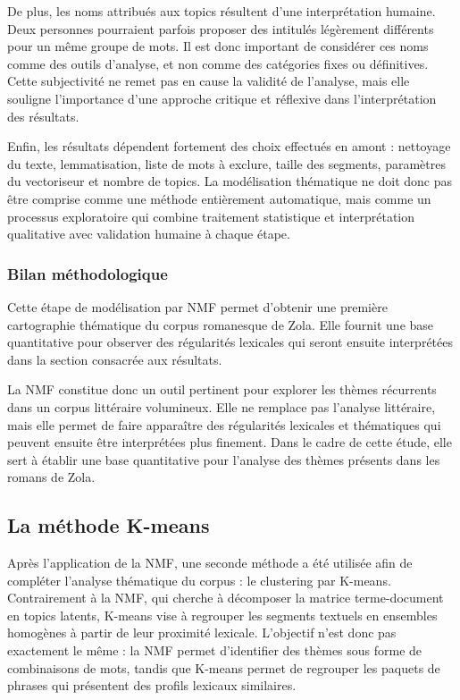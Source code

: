 De plus, les noms attribués aux topics résultent d’une interprétation humaine. Deux personnes pourraient parfois proposer des intitulés légèrement différents pour un même groupe de mots. Il est donc important de considérer ces noms comme des outils d’analyse, et non comme des catégories fixes ou définitives. Cette subjectivité ne remet pas en cause la validité de l’analyse, mais elle souligne l’importance d’une approche critique et réflexive dans l’interprétation des résultats.

Enfin, les résultats dépendent fortement des choix effectués en amont : nettoyage du texte, lemmatisation, liste de mots à exclure, taille des segments, paramètres du vectoriseur et nombre de topics. La modélisation thématique ne doit donc pas être comprise comme une méthode entièrement automatique, mais comme un processus exploratoire qui combine traitement statistique et interprétation qualitative avec validation humaine à chaque étape.

\subsubsection{Bilan méthodologique}

Cette étape de modélisation par NMF permet d'obtenir une première cartographie thématique du corpus romanesque de Zola. Elle fournit une base quantitative pour observer des régularités lexicales qui seront ensuite interprétées dans la section consacrée aux résultats.

La NMF constitue donc un outil pertinent pour explorer les thèmes récurrents dans un corpus littéraire volumineux. Elle ne remplace pas l’analyse littéraire, mais elle permet de faire apparaître des régularités lexicales et thématiques qui peuvent ensuite être interprétées plus finement. Dans le cadre de cette étude, elle sert à établir une base quantitative pour l’analyse des thèmes présents dans les romans de Zola.

\subsection{La méthode K-means}

Après l'application de la NMF, une seconde méthode a été utilisée afin de compléter l'analyse thématique du corpus : le clustering par K-means. Contrairement à la NMF, qui cherche à décomposer la matrice terme-document en topics latents, K-means vise à regrouper les segments textuels en ensembles homogènes à partir de leur proximité lexicale. L'objectif n'est donc pas exactement le même : la NMF permet d'identifier des thèmes sous forme de combinaisons de mots, tandis que K-means permet de regrouper les paquets de phrases qui présentent des profils lexicaux similaires.

